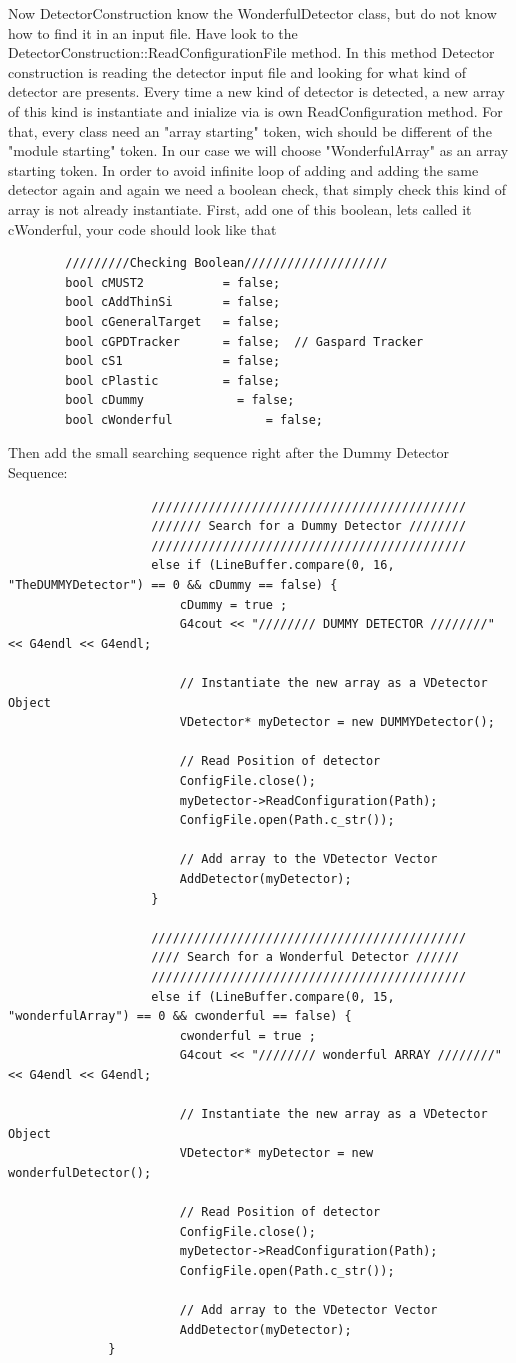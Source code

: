 \documentclass{book}
\begin{document}
		Now DetectorConstruction know the WonderfulDetector class, but do not know how to find it in an input file. Have look to the DetectorConstruction::ReadConfigurationFile method. In this method Detector construction is reading the detector input file and looking for what kind of detector are presents. Every time a new kind of detector is detected, a new array of this kind is instantiate and inialize via is own ReadConfiguration method. For that, every class need an "array starting" token, wich should be different of the "module starting" token. In our case we will choose "WonderfulArray" as an array starting token. In order to avoid infinite loop of adding and adding the same detector again and again we need a boolean check, that simply check this kind of array is not already instantiate. First, add one of this boolean, lets called it cWonderful, your code should look like that

	\begin{verbatim}
		/////////Checking Boolean////////////////////
		bool cMUST2           = false;
		bool cAddThinSi       = false;
		bool cGeneralTarget   = false;
		bool cGPDTracker      = false;	// Gaspard Tracker
		bool cS1              = false;
		bool cPlastic         = false;
		bool cDummy         	= false;
		bool cWonderful				= false;
	\end{verbatim}


	Then add the small searching sequence right after the Dummy Detector Sequence:
			
	\begin{verbatim}
					////////////////////////////////////////////
					/////// Search for a Dummy Detector ////////
					////////////////////////////////////////////
					else if (LineBuffer.compare(0, 16, "TheDUMMYDetector") == 0 && cDummy == false) {
						cDummy = true ;
						G4cout << "//////// DUMMY DETECTOR ////////" << G4endl << G4endl;

						// Instantiate the new array as a VDetector Object
						VDetector* myDetector = new DUMMYDetector();

						// Read Position of detector
						ConfigFile.close();
						myDetector->ReadConfiguration(Path);
						ConfigFile.open(Path.c_str());

						// Add array to the VDetector Vector
						AddDetector(myDetector);
					}

					////////////////////////////////////////////
					//// Search for a Wonderful Detector //////
					////////////////////////////////////////////
					else if (LineBuffer.compare(0, 15, "wonderfulArray") == 0 && cwonderful == false) {
						cwonderful = true ;
						G4cout << "//////// wonderful ARRAY ////////" << G4endl << G4endl;

						// Instantiate the new array as a VDetector Object
						VDetector* myDetector = new wonderfulDetector();

						// Read Position of detector
						ConfigFile.close();
						myDetector->ReadConfiguration(Path);
						ConfigFile.open(Path.c_str());

						// Add array to the VDetector Vector
						AddDetector(myDetector);
		      }
	\end{verbatim}
\end{document}
